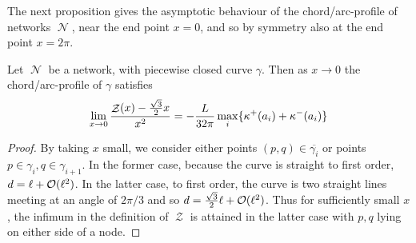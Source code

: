 \documentclass[11pt]{amsart}
\DeclareMathOperator{\chordarcprofile}{\mathcal{Z}}
\DeclareMathOperator{\network}{\mathcal{N}}
\begin{document}
The next proposition gives the asymptotic behaviour of the chord/arc-profile of networks \(\network\), near the end point \(x=0\), and so by symmetry also at the end point \(x=2\pi\).

\begin{prop}
Let \(\network\) be a network, with piecewise closed curve \(\gamma\). Then as \(x\to 0\) the chord/arc-profile of \(\gamma\) satisfies
\[
\lim_{x\to 0} \frac{\chordarcprofile(x) - \tfrac{\sqrt{3}}{2}x}{x^2} = - \frac{L}{32\pi} \max_i \{\curvecurv^+(a_i) + \curvecurv^-(a_i)\}
\]
\end{prop}

\begin{proof}
By taking $x$ small, we consider either points $(p,q) \in \overline{\gamma_i}$ or points $p \in \gamma_i, q \in \gamma_{i+1}$. In the former case, because the curve is straight to first order, $d = \ell + \operatorname{\mathcal{O}}(\ell^2)$. In the latter case, to first order, the curve is two straight lines meeting at an angle of $2\pi/3$ and so $d = \tfrac{\sqrt{3}}{2} \ell + \operatorname{\mathcal{O}}(\ell^2)$. Thus for sufficiently small $x$, the infimum in the definition of $\chordarcprofile$ is attained in the latter case with $p,q$ lying on either side of a node.


\end{proof}
\end{document}

